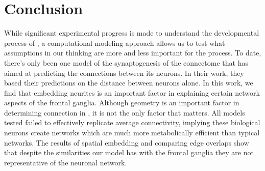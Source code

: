\section{Conclusion}


While significant experimental progress is made to understand the developmental process of \ce, a computational modeling approach allows us to test what assumptions in our thinking are more and less important for the process. 
To date, there’s only been one model of the synaptogenesis of the \ce connectome that has aimed at predicting the connections between its neurons. 
In their work, they based their predictions on the distance between neurons alone. 
In this work, we find that embedding neurites is an important factor in explaining certain network aspects of the \ce frontal ganglia.
Although geometry is an important factor in determining connection in \ce, it is not the only factor that matters.
All models tested failed to effectively replicate average connectivity, implying these biological neurons create networks which are much more metabolically efficient than typical networks.
The results of spatial embedding and comparing edge overlaps show that despite the similarities our model has with the \ce frontal ganglia they are not representative of the \ce neuronal network.